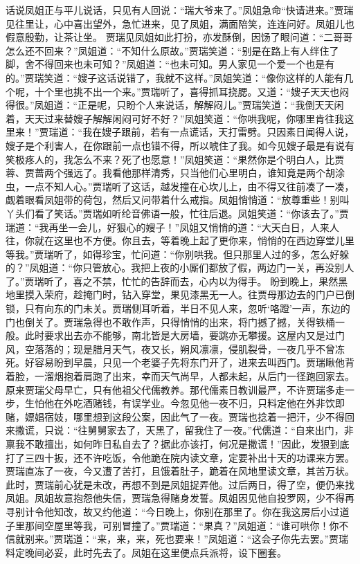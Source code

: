 \documentclass[12pt,oneside]{book}
\begin{document}
话说凤姐正与平儿说话，只见有人回说：“瑞大爷来了。”凤姐急命“快请进来。”贾瑞见往里让，心中喜出望外，急忙进来，见了凤姐，满面陪笑，连连问好。凤姐儿也假意殷勤，让茶让坐。
贾瑞见凤姐如此打扮，亦发酥倒，因饧了眼问道：“二哥哥怎么还不回来？”凤姐道：“不知什么原故。”贾瑞笑道：“别是在路上有人绊住了脚，舍不得回来也未可知？”凤姐道：“也未可知。男人家见一个爱一个也是有的。”贾瑞笑道：“嫂子这话说错了，我就不这样。”凤姐笑道：“像你这样的人能有几个呢，十个里也挑不出一个来。”贾瑞听了，喜得抓耳挠腮。又道：“嫂子天天也闷得很。”凤姐道：“正是呢，只盼个人来说话，解解闷儿。”贾瑞笑道：“我倒天天闲着，天天过来替嫂子解解闲闷可好不好？”凤姐笑道：“你哄我呢，你哪里肯往我这里来！”贾瑞道：“我在嫂子跟前，若有一点谎话，天打雷劈。只因素日闻得人说，嫂子是个利害人，在你跟前一点也错不得，所以唬住了我。如今见嫂子最是有说有笑极疼人的，我怎么不来？死了也愿意！”凤姐笑道：“果然你是个明白人，比贾蓉、贾蔷两个强远了。我看他那样清秀，只当他们心里明白，谁知竟是两个胡涂虫，一点不知人心。”贾瑞听了这话，越发撞在心坎儿上，由不得又往前凑了一凑，觑着眼看凤姐带的荷包，然后又问带着什么戒指。凤姐悄悄道：“放尊重些！别叫丫头们看了笑话。”贾瑞如听纶音佛语一般，忙往后退。凤姐笑道：“你该去了。”贾瑞道：“我再坐一会儿，好狠心的嫂子！”凤姐又悄悄的道：“大天白日，人来人往，你就在这里也不方便。你且去，等着晚上起了更你来，悄悄的在西边穿堂儿里等我。”贾瑞听了，如得珍宝，忙问道：“你别哄我。但只那里人过的多，怎么好躲的？”凤姐道：“你只管放心。我把上夜的小厮们都放了假，两边门一关，再没别人了。”贾瑞听了，喜之不禁，忙忙的告辞而去，心内以为得手。
盼到晚上，果然黑地里摸入荣府，趁掩门时，钻入穿堂，果见漆黑无一人。往贾母那边去的门户已倒锁，只有向东的门未关。贾瑞侧耳听着，半日不见人来，忽听‘咯蹬’一声，东边的门也倒关了。贾瑞急得也不敢作声，只得悄悄的出来，将门撼了撼，关得铁桶一般。此时要求出去亦不能够，南北皆是大房墙，要跳亦无攀援。这屋内又是过门风，空落落的；现是腊月天气，夜又长，朔风凛凛，侵肌裂骨，一夜几乎不曾冻死。好容易盼到早晨，只见一个老婆子先将东门开了，进来去叫西门。贾瑞瞅他背着脸，一溜烟抱着肩跑了出来，幸而天气尚早，人都未起，从后门一径跑回家去。
原来贾瑞父母早亡，只有他祖父代儒教养。那代儒素日教训最严，不许贾瑞多走一步，生怕他在外吃酒赌钱，有误学业。今忽见他一夜不归，只料定他在外非饮即赌，嫖娼宿妓，哪里想到这段公案，因此气了一夜。贾瑞也捻着一把汗，少不得回来撒谎，只说：“往舅舅家去了，天黑了，留我住了一夜。”代儒道：“自来出门，非禀我不敢擅出，如何昨日私自去了？据此亦该打，何况是撒谎！”因此，发狠到底打了三四十扳，还不许吃饭，令他跪在院内读文章，定要补出十天的功课来方罢。贾瑞直冻了一夜，今又遭了苦打，且饿着肚子，跪着在风地里读文章，其苦万状。
此时，贾瑞前心犹是未改，再想不到是凤姐捉弄他。过后两日，得了空，便仍来找凤姐。凤姐故意抱怨他失信，贾瑞急得赌身发誓。凤姐因见他自投罗网，少不得再寻别计令他知改，故又约他道：“今日晚上，你别在那里了。你在我这房后小过道子里那间空屋里等我，可别冒撞了。”贾瑞道：“果真？”凤姐道：“谁可哄你！你不信就别来。”贾瑞道：“来，来，来，死也要来！”凤姐道：“这会子你先去罢。”贾瑞料定晚间必妥，此时先去了。凤姐在这里便点兵派将，设下圈套。
\end{document}
